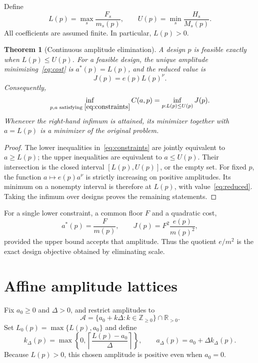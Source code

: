 \documentclass[11pt,a4paper]{article}
\newtheorem{theorem}{Theorem}\newtheorem{proposition}[theorem]{Proposition}\newtheorem{lemma}[theorem]{Lemma}\newtheorem{corollary}[theorem]{Corollary}\theoremstyle{definition}\newtheorem{definition}[theorem]{Definition}\newtheorem{example}[theorem]{Example}
\newcommand{\R}{\mathbb R}\newcommand{\C}{\mathbb C}\newcommand{\Z}{\mathbb Z}\newcommand{\N}{\mathbb N}\newcommand{\ip}[2]{\langle #1,#2\rangle}\newcommand{\norm}[1]{\lVert #1\rVert}\newcommand{\one}{\mathbf 1}
\begin{document}
Define
\begin{equation}\label{eq:interval}
 L(p)=\max_s\frac{F_s}{m_s(p)},\qquad
 U(p)=\min_s\frac{H_s}{M_s(p)}.
\end{equation}
All coefficients are assumed finite. In particular, $L(p)>0$.

\begin{theorem}[Continuous amplitude elimination]\label{thm:continuous}
A design $p$ is feasible exactly when $L(p)\le U(p)$.
For a feasible design, the unique amplitude minimizing~\eqref{eq:cost} is
$a^*(p)=L(p)$, and the reduced value is
\begin{equation}\label{eq:reduced}
 \boxed{J(p)=e(p)L(p)^\nu.}
\end{equation}
Consequently,
\[
 \inf_{p,a\text{ satisfying }\eqref{eq:constraints}}C(a,p)
 =\inf_{p:L(p)\le U(p)}J(p).
\]
Whenever the right-hand infimum is attained, its minimizer together with
$a=L(p)$ is a minimizer of the original problem.
\end{theorem}
\begin{proof}
The lower inequalities in~\eqref{eq:constraints} are jointly equivalent to
$a\ge L(p)$; the upper inequalities are equivalent to $a\le U(p)$.
Their intersection is the closed interval $[L(p),U(p)]$, or the empty set.
For fixed $p$, the function $a\mapsto e(p)a^\nu$ is strictly increasing on
positive amplitudes. Its minimum on a nonempty interval is therefore at
$L(p)$, with value~\eqref{eq:reduced}. Taking the infimum over designs proves
the remaining statements.
\end{proof}

For a single lower constraint, a common floor $F$ and a quadratic cost,
\begin{equation}\label{eq:quotient}
 a^*(p)=\frac{F}{m(p)},\qquad
 J(p)=F^2\frac{e(p)}{m(p)^2},
\end{equation}
provided the upper bound accepts that amplitude. Thus the quotient
$e/m^2$ is the exact design objective obtained by eliminating scale.

\section{Affine amplitude lattices}
Fix $a_0\ge0$ and $\Delta>0$, and restrict amplitudes to
\[
 \mathcal A=\{a_0+k\Delta:k\in\Z_{\ge0}\}\cap\R_{>0}.
\]
Set $L_0(p)=\max\{L(p),a_0\}$ and define
\begin{equation}\label{eq:grid}
 k_\Delta(p)=\max\left\{0,
    \left\lceil\frac{L(p)-a_0}{\Delta}\right\rceil\right\},\qquad
 a_\Delta(p)=a_0+\Delta k_\Delta(p).
\end{equation}
Because $L(p)>0$, this chosen amplitude is positive even when $a_0=0$.
\end{document}
